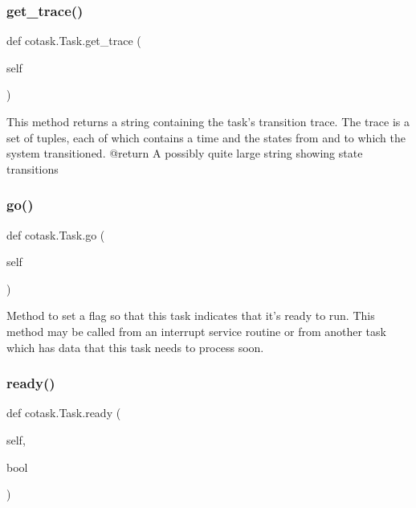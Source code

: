 \subsubsection{\texorpdfstring{get\+\_\+trace()}{get\_trace()}}
{\footnotesize\ttfamily def cotask.\+Task.\+get\+\_\+trace (\begin{DoxyParamCaption}\item[{}]{self }\end{DoxyParamCaption})}

\begin{DoxyVerb}This method returns a string containing the task's transition 
trace. The trace is a set of tuples, each of which contains a time 
and the states from and to which the system transitioned. 
@return A possibly quite large string showing state transitions \end{DoxyVerb}
 \mbox{\label{classcotask_1_1Task_a78e74d18a5ba94074c2b5309394409a5}} 
\subsubsection{\texorpdfstring{go()}{go()}}
{\footnotesize\ttfamily def cotask.\+Task.\+go (\begin{DoxyParamCaption}\item[{}]{self }\end{DoxyParamCaption})}

\begin{DoxyVerb}Method to set a flag so that this task indicates that it's 
ready to run. This method may be called from an interrupt service 
routine or from another task which has data that this task needs to 
process soon. \end{DoxyVerb}
 \mbox{\label{classcotask_1_1Task_af9c086f64b9d3e3bb209d582dcc431a4}} 
\subsubsection{\texorpdfstring{ready()}{ready()}}
{\footnotesize\ttfamily def cotask.\+Task.\+ready (\begin{DoxyParamCaption}\item[{}]{self,  }\item[{}]{bool }\end{DoxyParamCaption})}

